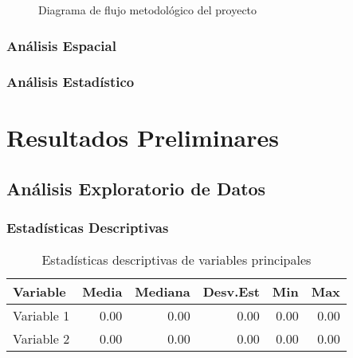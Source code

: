 \documentclass[11pt,letterpaper]{article}
\begin{document}
\begin{figure}[H]
    \centering
    \caption{Diagrama de flujo metodológico del proyecto}
    \label{fig:flujo}
\end{figure}

\subsubsection{Análisis Espacial}


\subsubsection{Análisis Estadístico}



\section{Resultados Preliminares}

\subsection{Análisis Exploratorio de Datos}

\subsubsection{Estadísticas Descriptivas}

\begin{table}[H]
\centering
\caption{Estadísticas descriptivas de variables principales}
\begin{tabular}{@{}lrrrrr@{}}
\toprule
\textbf{Variable} & \textbf{Media} & \textbf{Mediana} & \textbf{Desv.Est} & \textbf{Min} & \textbf{Max} \\
\midrule
Variable 1 & 0.00 & 0.00 & 0.00 & 0.00 & 0.00 \\
Variable 2 & 0.00 & 0.00 & 0.00 & 0.00 & 0.00 \\
\bottomrule
\end{tabular}
\end{table}
\end{document}
